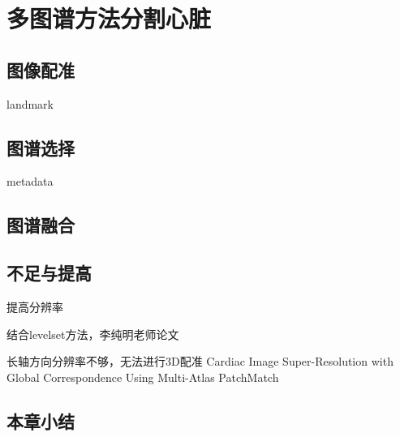 
\chapter{多图谱方法分割心脏}

\section{图像配准}
landmark\par

\section{图谱选择}
metadata\par

\section{图谱融合}

\section{不足与提高}

提高分辨率

结合levelset方法，李纯明老师论文

长轴方向分辨率不够，无法进行3D配准
Cardiac Image Super-Resolution with Global Correspondence Using Multi-Atlas PatchMatch

\section{本章小结}
